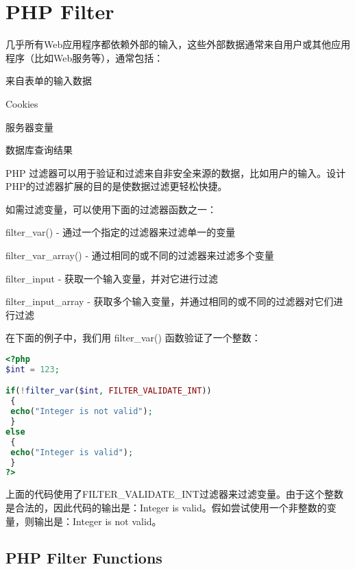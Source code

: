 \chapter{PHP Filter}



几乎所有Web应用程序都依赖外部的输入，这些外部数据通常来自用户或其他应用程序（比如Web服务等），通常包括：

\begin{compactitem}
\item 来自表单的输入数据
\item Cookies
\item 服务器变量
\item 数据库查询结果
\end{compactitem}








PHP 过滤器可以用于验证和过滤来自非安全来源的数据，比如用户的输入。设计PHP的过滤器扩展的目的是使数据过滤更轻松快捷。

如需过滤变量，可以使用下面的过滤器函数之一：

\begin{compactitem}
\item filter\_var() - 通过一个指定的过滤器来过滤单一的变量
\item filter\_var\_array() - 通过相同的或不同的过滤器来过滤多个变量
\item filter\_input - 获取一个输入变量，并对它进行过滤
\item filter\_input\_array - 获取多个输入变量，并通过相同的或不同的过滤器对它们进行过滤
\end{compactitem}


在下面的例子中，我们用 filter\_var() 函数验证了一个整数：

\begin{lstlisting}[language=PHP]
<?php
$int = 123;

if(!filter_var($int, FILTER_VALIDATE_INT))
 {
 echo("Integer is not valid");
 }
else
 {
 echo("Integer is valid");
 }
?>
\end{lstlisting}

上面的代码使用了FILTER\_VALIDATE\_INT过滤器来过滤变量。由于这个整数是合法的，因此代码的输出是：Integer is valid。假如尝试使用一个非整数的变量，则输出是：Integer is not valid。


\section{PHP Filter Functions}


